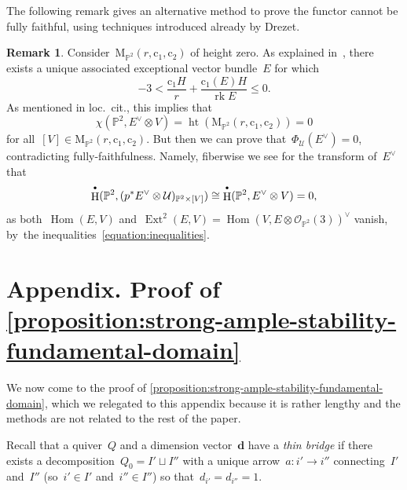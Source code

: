 \documentclass[11pt]{article}
\newcommand{\sbullet}{{\scriptscriptstyle\bullet}}
\newcommand{\csbullet}{{\raisebox{1pt}{$\sbullet$}}}
\theoremstyle{plain}
\theoremstyle{definition}
\newtheorem{remark}[theorem]{Remark}
\DeclareMathOperator\Ext{Ext}
\DeclareMathOperator\HH{H}
\DeclareMathOperator\Hom{Hom}
\DeclareMathOperator\rk{rk}
\newcommand\moduli{\ensuremath{\mathrm{M}}}
\newcommand\tuple[1]{\ensuremath{{\boldsymbol{#1}}}}
\begin{document}
The following remark gives an alternative method to prove
the functor cannot be fully faithful,
using techniques introduced already by Drezet.
\begin{remark}
\label{remark:associated-exceptional-bundle}
Consider~$\moduli_{\mathbb{P}^2}(r,\mathrm{c}_1,\mathrm{c}_2)$ of height zero.
As explained in~\cite[\S5.1]{MR0916199},
there exists a unique associated exceptional vector bundle~$E$
for which
\begin{equation}
\label{equation:inequalities}
-3<\frac{\mathrm{c}_1H}{r}+\frac{\mathrm{c}_1(E)H}{\rk E}\leq 0.
\end{equation}
As mentioned in loc.~cit.,
this implies that
\begin{equation*}
\chi(\mathbb{P}^2,E^\vee\otimes V)=\operatorname{ht}(\moduli_{\mathbb{P}^2}(r,\mathrm{c}_1,\mathrm{c}_2))=0
\end{equation*}
for all~$[V]\in\moduli_{\mathbb{P}^2}(r,\mathrm{c}_1,\mathrm{c}_2)$.
But then we can prove that~$\Phi_{\mathcal{U}}(E^\vee)=0$,
contradicting fully-faithfulness.
Namely, fiberwise we see for the transform of~$E^\vee$ that
\begin{equation*}
\HH^\csbullet(\mathbb{P}^2,(p^*E^\vee\otimes\mathcal{U})_{\mathbb{P}^2\times[V]})
\cong
\HH^\csbullet(\mathbb{P}^2,E^\vee\otimes V)
=
0,
\end{equation*}
as both~$\Hom(E,V)$ and~$\Ext^2(E,V)=\Hom(V,E\otimes\mathcal{O}_{\mathbb{P}^2}(3))^\vee$ vanish, by~the inequalities~\eqref{equation:inequalities}.
\end{remark}

\appendix

\section*{Appendix. Proof of \texorpdfstring{\cref{proposition:strong-ample-stability-fundamental-domain}}{Proposition \ref{proposition:strong-ample-stability-fundamental-domain}}}
\label{section:proof-no-thin-bridges}
We now come to the proof of \cref{proposition:strong-ample-stability-fundamental-domain},
which we relegated to this appendix because it is rather lengthy
and the methods are not related to the rest of the paper.

Recall that a quiver~$Q$ and a dimension vector~$\tuple{d}$
have a \emph{thin bridge}
if there exists a decomposition~$Q_0=I'\sqcup I''$
with a unique arrow~$a\colon i'\to i''$ connecting~$I'$ and~$I''$
(so~$i'\in I'$ and~$i''\in I''$)
so that~$d_{i'}=d_{i''}=1$.
\end{document}
